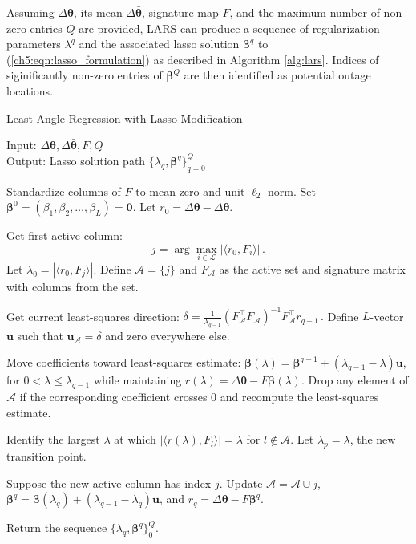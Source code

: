 Assuming $\Delta\boldsymbol{\theta}$, its mean $\Delta\bar{\boldsymbol{\theta}}$, signature map $F$, and the maximum number of non-zero entries $Q$ are provided, LARS can produce a sequence of regularization parameters $\lambda^q$ and the associated lasso solution $\boldsymbol{\beta}^q$ to (\ref{ch5:eqn:lasso_formulation}) as described in Algorithm \ref{alg:lars}. Indices of siginificantly non-zero entries of $\boldsymbol{\beta}^Q$ are then identified as potential outage locations. 
\begin{algorithm}
\caption{Least Angle Regression with Lasso Modification}
\label{alg:lars}
Input: $\Delta\boldsymbol{\theta}, \Delta\boldsymbol{\bar{\theta}}, F, Q$\\
Output: Lasso solution path $\{\lambda_q, \boldsymbol{\beta}^q\}_{q=0}^{Q}$
\begin{algorithmic}[1]
\State Standardize columns of $F$ to mean zero and unit $\ell_2$ norm. 
Set $\boldsymbol{\beta}^0 = (\beta_1, \beta_2, \dots, \beta_L) = \mathbf{0}$. Let $r_0 = \Delta\boldsymbol{\theta} - \Delta\boldsymbol{\bar{\theta}}$. 

\State Get first active column: 
$$
j = \arg\underset{i \in \mathcal{L}}\max|\langle r_0, F_i\rangle | \,.
$$
Let $\lambda_0 = |\langle r_0, F_j\rangle |$. Define $\mathcal{A} = \{j\}$ and $F_{\mathcal{A}}$ as the active set and signature matrix with columns from the set. 

\State Get current least-squares direction: 
$
\delta = \frac{1}{\lambda_{q - 1}}(F_{\mathcal{A}}^{\top}F_{\mathcal{A}})^{-1}F_{\mathcal{A}}^{\top}r_{q-1} \,.
$ 
Define $L$-vector $\mathbf{u}$ such that $\mathbf{u}_{\mathcal{A}} = \delta$ and zero everywhere else.

\State  Move coefficients toward least-squares estimate: $\boldsymbol{\beta}(\lambda) = \boldsymbol{\beta}^{q-1} + (\lambda_{q-1} - \lambda) \mathbf{u}$, for $0 < \lambda \le \lambda_{q-1}$ while maintaining $r(\lambda) = \Delta\boldsymbol{\theta} - F \boldsymbol{\beta}(\lambda)$. Drop any element of $\mathcal{A}$ if the corresponding coefficient crosses 0 and recompute the least-squares estimate. 

\State Identify the largest $\lambda$ at which $|\langle r(\lambda), F_l \rangle| = \lambda$ for $l \notin \mathcal{A}$. Let $\lambda_p = \lambda$, the new transition point.

\State Suppose the new active column has index $j$. Update $\mathcal{A} = \mathcal{A} \cup j$, $\boldsymbol{\beta}^q = \boldsymbol{\beta}(\lambda_q) + (\lambda_{q-1} - \lambda_q)\mathbf{u}$, and $r_q = \Delta\boldsymbol{\theta} - F \boldsymbol{\beta}^q$.
\EndFor

\State Return the sequence $\{\lambda_q, \boldsymbol{\beta}^q \}_0^Q$.
\end{algorithmic}
\end{algorithm}

